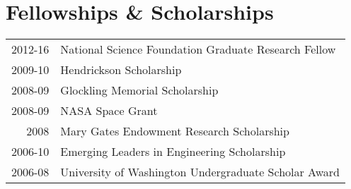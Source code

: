 \documentclass[a4paper,10pt]{article} %
\begin{document}
\FloatBarrier


\section{Fellowships \& Scholarships}

\begin{table}[H]
\begin{tabular}{rl}
\textsc{2012-16} & National Science Foundation Graduate Research Fellow\\
\textsc{2009-10} & Hendrickson Scholarship\\
\textsc{2008-09} & Glockling Memorial Scholarship\\
\textsc{2008-09} & NASA Space Grant\\
\textsc{2008} & Mary Gates Endowment Research Scholarship\\
\textsc{2006-10} & Emerging Leaders in Engineering Scholarship\\
\textsc{2006-08} & University of Washington Undergraduate Scholar Award\\
\end{tabular}
\end{table}

\FloatBarrier




\end{document}
